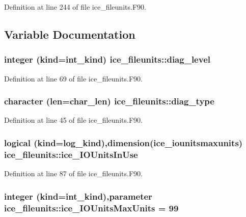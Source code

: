 Definition at line 244 of file ice\_\-fileunits.F90.

\subsection{Variable Documentation}
\hypertarget{namespaceice__fileunits_a65eb74a162a71d932a76d174b05903a5}{
\subsubsection[{diag\_\-level}]{\setlength{\rightskip}{0pt plus 5cm}integer (kind=int\_\-kind) {\bf ice\_\-fileunits::diag\_\-level}}}
\label{namespaceice__fileunits_a65eb74a162a71d932a76d174b05903a5}


Definition at line 69 of file ice\_\-fileunits.F90.\hypertarget{namespaceice__fileunits_af588ef6b480e0e304e6b78cfd39aa602}{
\subsubsection[{diag\_\-type}]{\setlength{\rightskip}{0pt plus 5cm}character (len=char\_\-len) {\bf ice\_\-fileunits::diag\_\-type}}}
\label{namespaceice__fileunits_af588ef6b480e0e304e6b78cfd39aa602}


Definition at line 45 of file ice\_\-fileunits.F90.\hypertarget{namespaceice__fileunits_ac18233d112e8380d29b2a9269451ea4b}{
\subsubsection[{ice\_\-IOUnitsInUse}]{\setlength{\rightskip}{0pt plus 5cm}logical (kind=log\_\-kind),dimension(ice\_\-iounitsmaxunits) {\bf ice\_\-fileunits::ice\_\-IOUnitsInUse}}}
\label{namespaceice__fileunits_ac18233d112e8380d29b2a9269451ea4b}


Definition at line 87 of file ice\_\-fileunits.F90.\hypertarget{namespaceice__fileunits_a51e62a76a75cf9695476d895543860a8}{
\subsubsection[{ice\_\-IOUnitsMaxUnits}]{\setlength{\rightskip}{0pt plus 5cm}integer (kind=int\_\-kind),parameter {\bf ice\_\-fileunits::ice\_\-IOUnitsMaxUnits} = 99}}
\label{namespaceice__fileunits_a51e62a76a75cf9695476d895543860a8}


